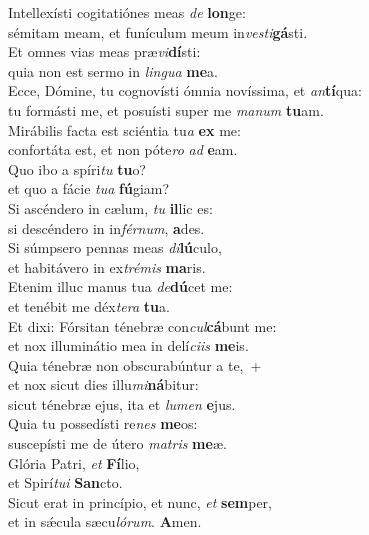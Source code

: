\evenverse Intellexísti cogitatiónes meas \textit{de} \textbf{lon}ge:~\*\\
\evenverse sémitam meam, et funículum meum in\textit{ve}\textit{sti}\textbf{gá}sti.\\
\oddverse Et omnes vias meas præ\textit{vi}\textbf{dí}sti:~\*\\
\oddverse quia non est sermo in \textit{lin}\textit{gua} \textbf{me}a.\\
\evenverse Ecce, Dómine, tu cognovísti ómnia novíssima, et \textit{an}\textbf{tí}qua:~\*\\
\evenverse tu formásti me, et posuísti super me \textit{ma}\textit{num} \textbf{tu}am.\\
\oddverse Mirábilis facta est sciéntia tu\textit{a} \textbf{ex} me:~\*\\
\oddverse confortáta est, et non póte\textit{ro} \textit{ad} \textbf{e}am.\\
\evenverse Quo ibo a spíri\textit{tu} \textbf{tu}o?~\*\\
\evenverse et quo a fácie \textit{tu}\textit{a} \textbf{fú}giam?\\
\oddverse Si ascéndero in cælum, \textit{tu} \textbf{il}lic es:~\*\\
\oddverse si descéndero in in\textit{fér}\textit{num}, \textbf{a}des.\\
\evenverse Si súmpsero pennas meas \textit{di}\textbf{lú}culo,~\*\\
\evenverse et habitávero in ex\textit{tré}\textit{mis} \textbf{ma}ris.\\
\oddverse Etenim illuc manus tua \textit{de}\textbf{dú}cet me:~\*\\
\oddverse et tenébit me déx\textit{te}\textit{ra} \textbf{tu}a.\\
\evenverse Et dixi: Fórsitan ténebræ con\textit{cul}\textbf{cá}bunt me:~\*\\
\evenverse et nox illuminátio mea in delí\textit{ci}\textit{is} \textbf{me}is.\\
\oddverse Quia ténebræ non obscurabúntur a te,~+\\
\oddverse  et nox sicut dies illu\textit{mi}\textbf{ná}bitur:~\*\\
\oddverse sicut ténebræ ejus, ita et \textit{lu}\textit{men} \textbf{e}jus.\\
\evenverse Quia tu possedísti re\textit{nes} \textbf{me}os:~\*\\
\evenverse suscepísti me de útero \textit{ma}\textit{tris} \textbf{me}æ.\\
\oddverse Glória Patri, \textit{et} \textbf{Fí}lio,~\*\\
\oddverse et Spirí\textit{tu}\textit{i} \textbf{San}cto.\\
\evenverse Sicut erat in princípio, et nunc, \textit{et} \textbf{sem}per,~\*\\
\evenverse et in sǽcula sæcu\textit{ló}\textit{rum}. \textbf{A}men.\\
